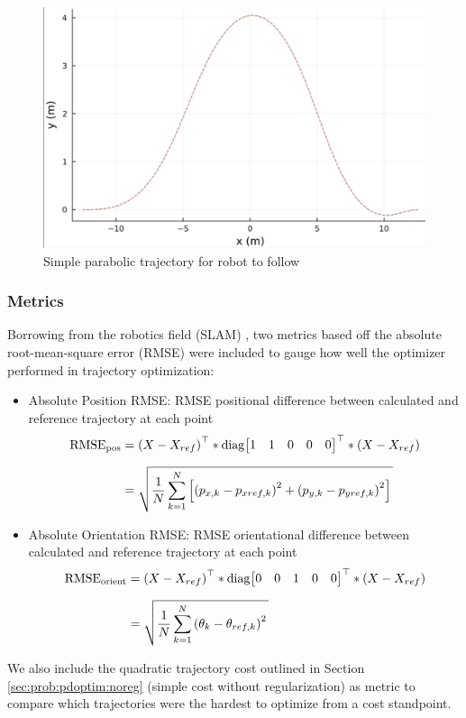 \documentclass[11pt]{article}
\begin{document}
    \begin{figure}[h!]
        \centering
        \includegraphics[width=0.5\linewidth]{trajectory}
        \caption{Simple parabolic trajectory for robot to follow}
        \label{fig:trajectory}
    \end{figure}

    \subsubsection{Metrics} \label{sec:results:metrics}
    Borrowing from the robotics field (SLAM) \cite{metrics1}, two metrics based off the absolute root-mean-square error (RMSE) were included to gauge how well the optimizer performed in trajectory optimization:
    \begin{itemize}
        \item Absolute Position RMSE: RMSE positional difference between calculated and reference trajectory at each point \begin{align*}
            \mathrm{RMSE}_{\mathrm{pos}} &= \transp{X - X_{ref}} * \mathrm{diag}\transbmat{1 & 1 & 0 & 0 & 0} * \left(X - X_{ref}\right) \fracln
            &= \sqrt{\strut \dfrac{1}{N} \sum^N_{k=1} \left[\left(p_{x,k} - p_{xref, k}\right)^2 + \left(p_{y,k} - p_{yref, k}\right)^2\right]  \strut\strut }
        \end{align*}
        \item Absolute Orientation RMSE: RMSE orientational difference between calculated and reference trajectory at each point\begin{align*}
            \mathrm{RMSE}_{\mathrm{orient}} &= \transp{X - X_{ref}} *  \mathrm{diag}\transbmat{0 & 0 & 1 & 0 & 0} * \left(X - X_{ref}\right) \fracln
            &= \sqrt{\strut \dfrac{1}{N} \sum^N_{k=1} \left(\theta_{k} - \theta_{ref, k}\right)^2 \strut\strut }
        \end{align*}
    \end{itemize}
    
    We also include the quadratic trajectory cost outlined in Section \ref{sec:prob:pdoptim:noreg} (simple cost without regularization) as metric to compare which trajectories were the hardest to optimize from a cost standpoint.
\end{document}
